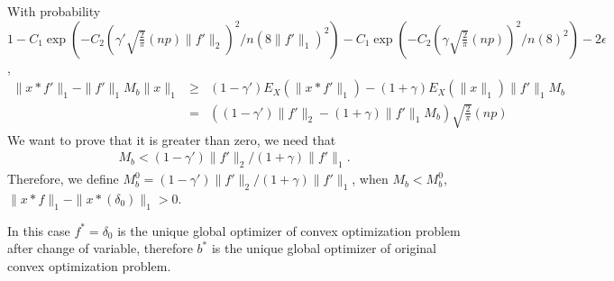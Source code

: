 \documentclass[letter, 10pt]{article}
\numberwithin{equation}{section}
\def \endprf{\hfill {\vrule height6pt width6pt depth0pt}\medskip}
\newenvironment{proof}{\noindent {\bf Proof} }{\endprf\par}
\begin{document}
\begin{proof}
With probability $1-C_1 \exp (-C_2 (\gamma' \sqrt{\frac{2}{\pi}}(np)\|f'\|_2)^2/n(8\|f'\|_1)^2)-C_1 \exp (-C_2 (\gamma\sqrt{\frac{2}{\pi}}(np))^2/n(8)^2)-2\epsilon$, 
\begin{eqnarray*}
\|x*f'\|_1  -\|f'\|_{1} M_b \|x\|_1
&\geq & (1-\gamma')  E_X(\|x*f'\|_1) - (1+\gamma)E_X(\|x\|_1) \|f'\|_{1 } M_b\\
&= & ((1-\gamma') \|f'\|_2 - 
(1+\gamma) \|f'\|_{1 } M_b)\sqrt{\frac{2}{\pi}}(np)
\end{eqnarray*}
We want to  prove that it is greater than zero, we need that 
\begin{eqnarray*}
M_b<  (1-\gamma')\|f'\|_2 / (1+\gamma) \|f'\|_{1}.
\end{eqnarray*}
Therefore, we define $M_b^0  =(1-\gamma')\|f'\|_2 / (1+\gamma) \|f'\|_{1} $, when 
$M_b < M_b^0$,  $\|x*f\|_1-\|x*(\delta_0)\|_1>0$. 

In this case $f^*=\delta_0 $ is the unique global optimizer of  convex optimization problem after change of variable, therefore $b^*$ is the unique global optimizer of original convex optimization problem.
\end{proof}

\end{document}
